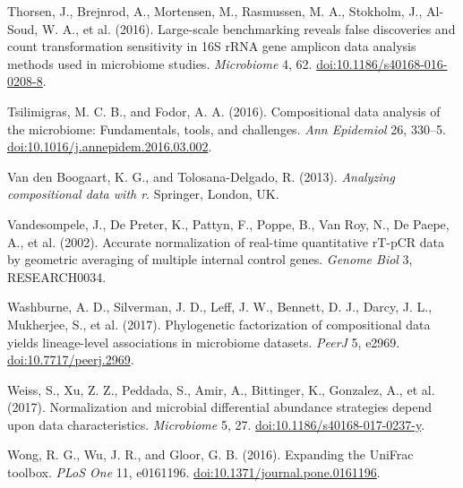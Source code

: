 \documentclass[twocolumn]{article}
\begin{document}
Thorsen, J., Brejnrod, A., Mortensen, M., Rasmussen, M. A., Stokholm,
J., Al-Soud, W. A., et al. (2016). Large-scale benchmarking reveals
false discoveries and count transformation sensitivity in 16S rRNA gene
amplicon data analysis methods used in microbiome studies.
\emph{Microbiome} 4, 62.
\href{http://doi.org/10.1186/s40168-016-0208-8}{doi:10.1186/s40168-016-0208-8}.

Tsilimigras, M. C. B., and Fodor, A. A. (2016). Compositional data
analysis of the microbiome: Fundamentals, tools, and challenges.
\emph{Ann Epidemiol} 26, 330--5.
\href{http://doi.org/10.1016/j.annepidem.2016.03.002}{doi:10.1016/j.annepidem.2016.03.002}.

Van den Boogaart, K. G., and Tolosana-Delgado, R. (2013).
\emph{Analyzing compositional data with r}. Springer, London, UK.

Vandesompele, J., De Preter, K., Pattyn, F., Poppe, B., Van Roy, N., De
Paepe, A., et al. (2002). Accurate normalization of real-time
quantitative rT-pCR data by geometric averaging of multiple internal
control genes. \emph{Genome Biol} 3, RESEARCH0034.

Washburne, A. D., Silverman, J. D., Leff, J. W., Bennett, D. J., Darcy,
J. L., Mukherjee, S., et al. (2017). Phylogenetic factorization of
compositional data yields lineage-level associations in microbiome
datasets. \emph{PeerJ} 5, e2969.
\href{http://doi.org/10.7717/peerj.2969}{doi:10.7717/peerj.2969}.

Weiss, S., Xu, Z. Z., Peddada, S., Amir, A., Bittinger, K., Gonzalez,
A., et al. (2017). Normalization and microbial differential abundance
strategies depend upon data characteristics. \emph{Microbiome} 5, 27.
\href{http://doi.org/10.1186/s40168-017-0237-y}{doi:10.1186/s40168-017-0237-y}.

Wong, R. G., Wu, J. R., and Gloor, G. B. (2016). Expanding the UniFrac
toolbox. \emph{PLoS One} 11, e0161196.
\href{http://doi.org/10.1371/journal.pone.0161196}{doi:10.1371/journal.pone.0161196}.
\end{document}
